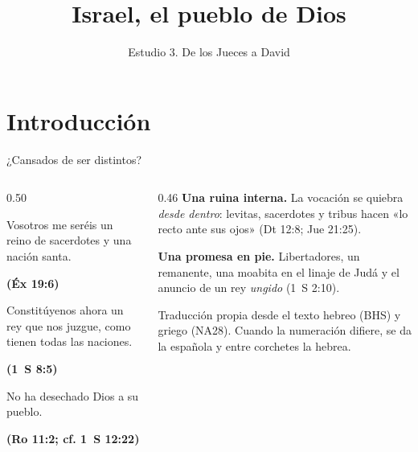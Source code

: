 \documentclass[hyperref={bookmarks=false},aspectratio=169]{beamer}
\title[Israel 3: Jueces--David]{\bfseries{Israel, el pueblo de Dios}}
\subtitle{Estudio 3. De los Jueces a David}
\author{}\institute{}\date{}
\newcommand{\fuente}[1]{\par\hfill{\upshape\bfseries\footnotesize\textcolor{ladrillo}{#1}}}
\newcommand{\destacar}[1]{\textbf{\textcolor{ladrillo}{#1}}}
\begin{document}
\frame{\titlepage}

\section{Introducción}
\begin{frame}{¿Cansados de ser distintos?}
\begin{columns}[T,onlytextwidth]
\begin{column}{0.50\textwidth}
\begin{cita}Vosotros me seréis un reino de sacerdotes y una nación santa.\fuente{(Éx 19:6)}\end{cita}
\begin{cita}Constitúyenos ahora un rey que nos juzgue, como tienen todas las naciones.\fuente{(1~S 8:5)}\end{cita}
\begin{cita}No ha desechado Dios a su pueblo.\fuente{(Ro 11:2; cf. 1~S 12:22)}\end{cita}
\end{column}
\begin{column}{0.46\textwidth}\small
\destacar{Una ruina interna.} La vocación se quiebra \emph{desde dentro}: levitas, sacerdotes y tribus hacen «lo recto ante sus ojos» (Dt 12:8; Jue 21:25).\par\medskip
\destacar{Una promesa en pie.} Libertadores, un remanente, una moabita en el linaje de Judá y el anuncio de un rey \emph{ungido} (1~S 2:10).\par\medskip
\begin{notalam}
Traducción propia desde el texto hebreo (BHS) y griego (NA28). Cuando la numeración difiere, se da la española y entre corchetes la hebrea.
\end{notalam}
\end{column}
\end{columns}
\end{frame}
\end{document}
